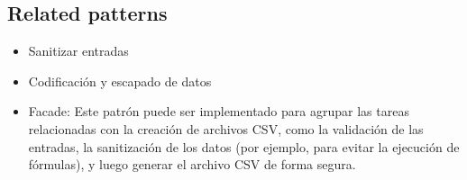 \subsection*{Related patterns}
\begin{itemize}
    \item Sanitizar entradas
    \item Codificación y escapado de datos
    \item Facade: Este patrón puede ser implementado para agrupar las tareas relacionadas con la creación de archivos CSV, como la validación de las entradas, la sanitización de los datos (por ejemplo, para evitar la ejecución de fórmulas), y luego generar el archivo CSV de forma segura.
\end{itemize}